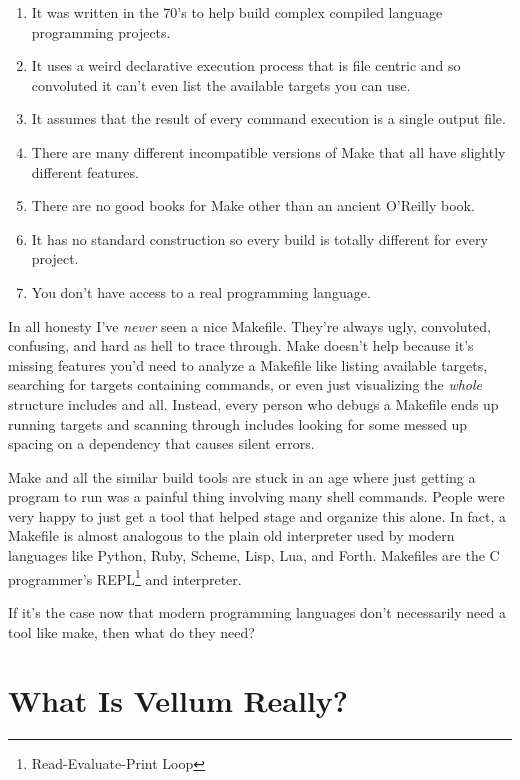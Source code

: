 \begin{enumerate}
\item It was written in the 70's to help build complex compiled language
programming projects.
\item It uses a weird declarative execution process that is file centric and so
convoluted it can't even list the available targets you can use.
\item It assumes that the result of every command execution is a single output file.
\item There are many different incompatible versions of Make that all have slightly different features.
\item There are no good books for Make other than an ancient O'Reilly book.
\item It has no standard construction so every build is totally different for
every project.
\item You don't have access to a real programming language.
\end{enumerate}

In all honesty I've \emph{never} seen a nice Makefile.  They're always ugly,
convoluted, confusing, and hard as hell to trace through.  Make doesn't help
because it's missing features you'd need to analyze a Makefile like listing
available targets, searching for targets containing commands, or even just
visualizing the \emph{whole} structure includes and all.  Instead, every
person who debugs a Makefile ends up running targets and scanning through
includes looking for some messed up spacing on a dependency that causes
silent errors.

Make and all the similar build tools are stuck in an age where just getting a
program to run was a painful thing involving many shell commands.  People were
very happy to just get a tool that helped stage and organize this alone.  In
fact, a Makefile is almost analogous to the plain old interpreter used by modern
languages like Python, Ruby, Scheme, Lisp, Lua, and Forth.  Makefiles are the C
programmer's REPL\footnote{Read-Evaluate-Print Loop} and interpreter.

If it's the case now that modern programming languages don't necessarily need a
tool like make, then what do they need?




\section{What Is Vellum Really?}

